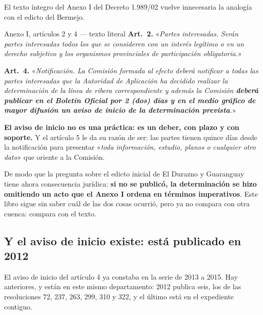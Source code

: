 El texto íntegro del Anexo I del Decreto 1.989/02 vuelve innecesaria la analogía con el edicto del Bermejo.

\begin{ficha}{Anexo I, artículos 2 y 4 --- texto literal}
\textbf{Art.\ 2.} «\textit{Partes interesadas. Serán partes interesadas todos los que se
consideren con un interés legítimo o en un derecho subjetivo y los organismos provinciales de
participación obligatoria.}»

\textbf{Art.\ 4.} «\textit{Notificación. La Comisión formada al efecto deberá notificar a
todas las partes interesadas que la Autoridad de Aplicación ha decidido realizar la
determinación de la línea de ribera correspondiente y además la Comisión \textbf{deberá
publicar en el Boletín Oficial por 2 (dos) días y en el medio gráfico de mayor difusión un
aviso de inicio de la determinación prevista}.}»
\end{ficha}

\textbf{El aviso de inicio no es una práctica: es un deber, con plazo y con soporte.} Y el
artículo 5 le da su razón de ser: las partes tienen quince días desde la notificación para
presentar «\textit{toda información, estudio, planos o cualquier otro dato}» que oriente a la
Comisión.

\begin{cautela}
De modo que la pregunta sobre el edicto inicial de El Durazno y Guaranguay tiene ahora consecuencia jurídica: \textbf{si no se publicó, la determinación se hizo omitiendo un acto que el Anexo I ordena en términos imperativos}. Este libro sigue sin saber cuál de las dos cosas ocurrió, pero ya no compara con otra cuenca: compara con el texto.
\end{cautela}

\subsection*{Y el aviso de inicio existe: está publicado en 2012}

El aviso de inicio del artículo 4 ya constaba en la serie de 2013 a 2015. Hay
anteriores, y están en este mismo departamento: 2012 publica seis, los de las resoluciones 72, 237, 263, 299, 310 y 322, y el último está en el expediente contiguo.

